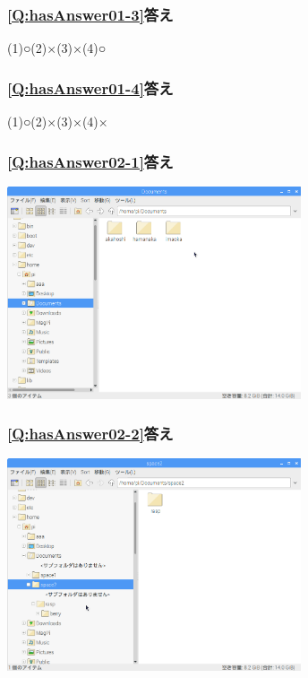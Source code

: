 \documentclass[a4paper,12pt]{jarticle}
\begin{document}
  \subsubsection{\bfseries
  \ref*{Q:hasAnswer01-3}答え}

  (1)○\hspace{2em}(2)×\hspace{2em}(3)×\hspace{2em}(4)○

  \subsubsection{\bfseries
  \ref*{Q:hasAnswer01-4}答え}

  (1)○\hspace{2em}(2)×\hspace{2em}(3)×\hspace{2em}(4)×

\clearpage

\subsubsection{\bfseries
  \ref*{Q:hasAnswer02-1}答え}

\bigskip


\centering
\includegraphics[width=0.65\textwidth]{textbook-img212.png}
\flushleft

\bigskip


\bigskip


\bigskip

\subsubsection{\bfseries
\ref*{Q:hasAnswer02-2}答え}

\bigskip



\centering
\includegraphics[width=0.65\textwidth]{textbook-img213.png}
\flushleft
\end{document}
